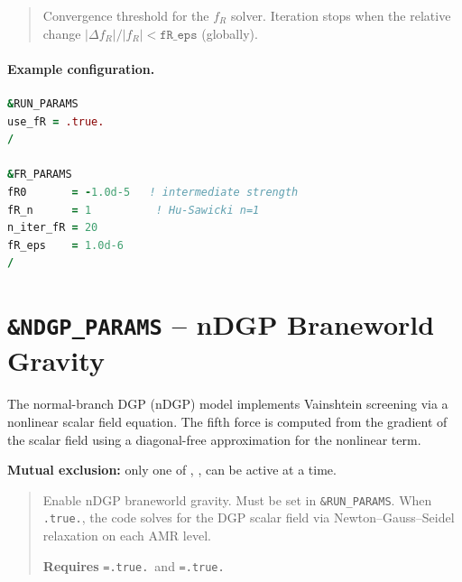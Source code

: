 \label{param:fR_eps}

\begin{quote}
Convergence threshold for the $f_R$ solver.  Iteration stops when
the relative change $|\Delta f_R|/|f_R| < \texttt{fR\_eps}$ (globally).
\end{quote}

\paragraph{Example configuration.}
\begin{lstlisting}[language=Fortran]
&RUN_PARAMS
use_fR = .true.
/

&FR_PARAMS
fR0       = -1.0d-5   ! intermediate strength
fR_n      = 1          ! Hu-Sawicki n=1
n_iter_fR = 20
fR_eps    = 1.0d-6
/
\end{lstlisting}


\section{\texttt{\&NDGP\_PARAMS} -- nDGP Braneworld Gravity}
\label{sec:ndgp_params}

The normal-branch DGP (nDGP) model implements Vainshtein screening
via a nonlinear scalar field equation.  The fifth force is computed
from the gradient of the scalar field using a diagonal-free
approximation for the nonlinear term.

\textbf{Mutual exclusion:} only one of ,
,  can be active at a time.

\label{param:use_nDGP}

\begin{quote}
Enable nDGP braneworld gravity.  Must be set in \texttt{\&RUN\_PARAMS}.
When \texttt{.true.}, the code solves for the DGP scalar field via
Newton--Gauss--Seidel relaxation on each AMR level.

\textbf{Requires} \texttt{=.true.}\ and
\texttt{=.true.}
\end{quote}

\label{param:omega_rc}

